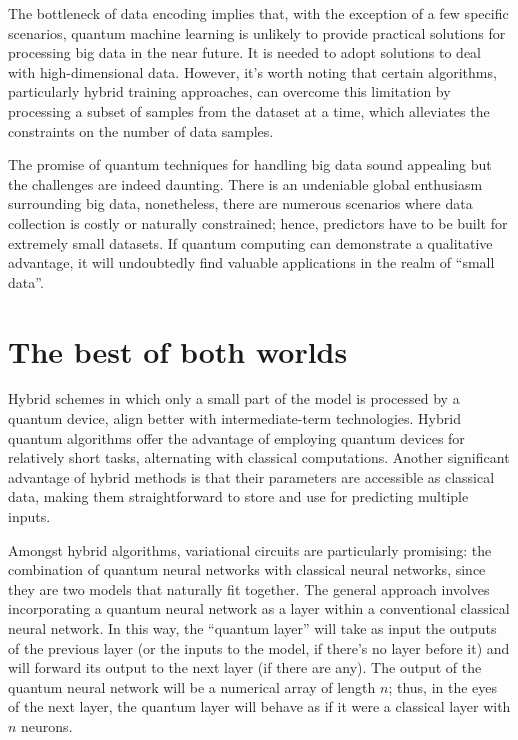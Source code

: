 The bottleneck of data encoding implies that, with the exception of a few specific scenarios, quantum machine learning is unlikely to provide practical solutions for processing big data in the near future.  It is needed to adopt solutions to deal with high-dimensional data. However, it's worth noting that certain algorithms, particularly hybrid training approaches, can overcome this limitation by processing a subset of samples from the dataset at a time, which alleviates the constraints on the number of data samples.

The promise of quantum techniques for handling big data sound appealing but the challenges are indeed daunting. There is an undeniable global enthusiasm surrounding big data, nonetheless, there are numerous scenarios where data collection is costly or naturally constrained; hence, predictors have to be built for extremely small datasets. If quantum computing can demonstrate a qualitative advantage, it will undoubtedly find valuable applications in the realm of ``small data''.

\section{The best of both worlds}

Hybrid schemes in which only a small part of the model is processed by a quantum device, align better with intermediate-term technologies. Hybrid quantum algorithms offer the advantage of employing quantum devices for relatively short tasks, alternating with classical computations. Another significant advantage of hybrid methods is that their parameters are accessible as classical data, making them straightforward to store and use for predicting multiple inputs.

Amongst hybrid algorithms, variational circuits are particularly promising: the combination of quantum neural networks with classical neural networks, since they are two models that naturally fit together. The general approach involves incorporating a quantum neural network as a layer within a conventional classical neural network. In this way, the “quantum layer” will take as input the outputs of the previous layer (or the inputs to the model, if there’s no layer before it) and will forward its output to the next layer (if there are any). The output of the quantum neural network will be a numerical array of length $n$; thus, in the eyes of the next layer, the quantum layer will behave as if it were a classical layer with $n$ neurons.

